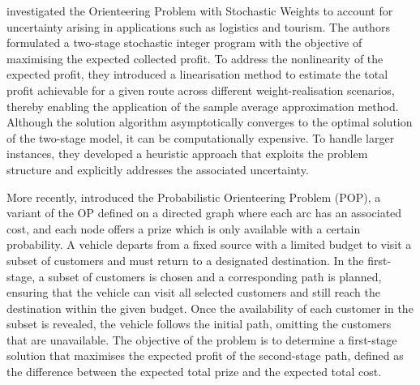 \documentclass[11pt]{article}
\theoremstyle{definition}
\begin{document}
\citet{Evers2014} investigated the Orienteering Problem with Stochastic Weights to account for uncertainty arising in applications such as logistics and tourism. The authors formulated a two-stage stochastic integer program with the objective of maximising the expected collected profit. To address the nonlinearity of the expected profit, they introduced a linearisation method to estimate the total profit achievable for a given route across different weight-realisation scenarios, thereby enabling the application of the sample average approximation method. Although the solution algorithm asymptotically converges to the optimal solution of the two-stage model, it can be computationally expensive. To handle larger instances, they developed a heuristic approach that exploits the problem structure and explicitly addresses the associated uncertainty.


More recently, \citet{Angelelli2017} introduced the Probabilistic Orienteering Problem (POP), a variant of the OP defined on a directed graph where each arc has an associated cost, and each node offers a prize which is only available with a certain probability. A vehicle departs from a fixed source with a limited budget to visit a subset of customers and must return to a designated destination. In the first-stage, a subset of customers is chosen and a corresponding path is planned, ensuring that the vehicle can visit all selected customers and still reach the destination within the given budget. Once the availability of each customer in the subset is revealed, the vehicle follows the initial path, omitting the customers that are unavailable. The objective of the problem is to determine a first-stage solution that maximises the expected profit of the second-stage path, defined as the difference between the expected total prize and the expected total cost. %
\end{document}
